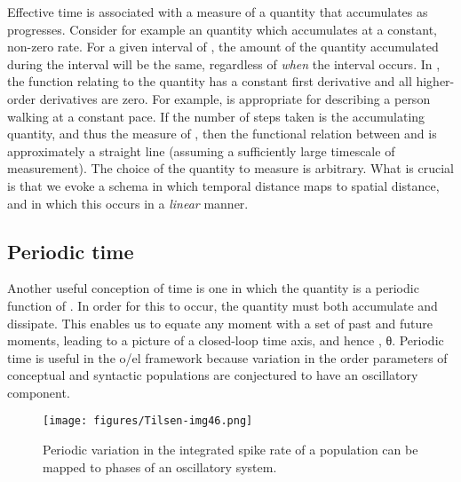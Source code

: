   Effective time is associated with a measure of a quantity that accumulates as  progresses. Consider for example an  quantity which accumulates at a constant, non-zero rate. For a given interval of , the amount of the quantity accumulated during the interval will be the same, regardless of \textit{when} the interval occurs. In , the function relating  to the  quantity has a constant first derivative and all higher-order derivatives are zero. For example,  is appropriate for describing a person walking at a constant pace. If the number of steps taken is the accumulating quantity, and thus the measure of , then the functional relation between  and  is approximately a straight line (assuming a sufficiently large timescale of measurement). The choice of the quantity to measure is arbitrary. What is crucial is that we evoke a schema in which temporal distance maps to spatial distance, and in which this occurs in a \textit{linear} manner.

\subsection{Periodic time}

Another useful conception of time is one in which the  quantity is a periodic function of . In order for this to occur, the quantity must both accumulate and dissipate. This enables us to equate any moment with a set of past and future moments, leading to a picture of a closed-loop time axis, and hence , θ. Periodic time is useful in the o/el framework because variation in the order parameters of conceptual and syntactic populations are conjectured to have an oscillatory component.

  
\begin{figure}
\texttt{[image: figures/Tilsen-img46.png]}
\caption{Periodic variation in the integrated spike rate of a population can be mapped to phases of an oscillatory system.}
\label{fig:3:18}
\end{figure}
 

